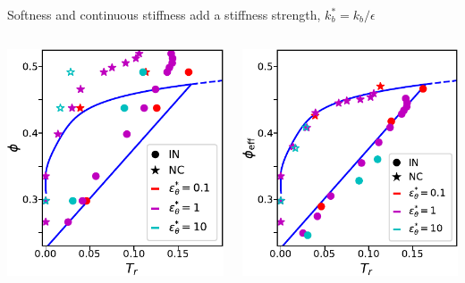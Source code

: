 \documentclass[aspectratio=169]{beamer}
\begin{document}
\begin{frame}[t]{Softness and continuous stiffness add a stiffness strength, $k_{b}^{*} = k_{b}/\epsilon$}
  \centering
  \begin{columns}

    \centering
    \vspace{0.2\baselineskip}

    \includegraphics[]{../figures/fig-soft_phase_diag_vs_kb/fig-phase_diag_phi_HS.pdf}

    \centering
    \vspace{0.2\baselineskip}

    \includegraphics[]{../figures/fig-soft_phase_diag_vs_kb/fig-phase_diag_phi_eff.pdf}

  \end{columns}
\end{frame}
\end{document}

